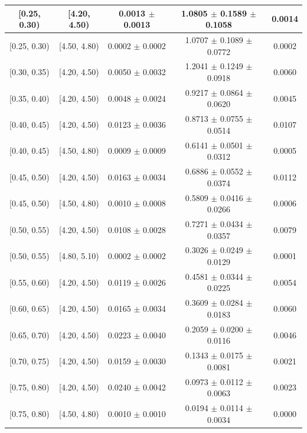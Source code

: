 \begin{longtable}{|c|c|c|c|c|}
\hline
\endlastfoot
[0.25, 0.30) & [4.20, 4.50) & 0.0013 $\pm$ 0.0013 & 1.0805 $\pm$ 0.1589 $\pm$ 0.1058 & 0.0014 \\ 
\hline
[0.25, 0.30) & [4.50, 4.80) & 0.0002 $\pm$ 0.0002 & 1.0707 $\pm$ 0.1089 $\pm$ 0.0772 & 0.0002 \\ 
\hline
[0.30, 0.35) & [4.20, 4.50) & 0.0050 $\pm$ 0.0032 & 1.2041 $\pm$ 0.1249 $\pm$ 0.0918 & 0.0060 \\ 
\hline
[0.35, 0.40) & [4.20, 4.50) & 0.0048 $\pm$ 0.0024 & 0.9217 $\pm$ 0.0864 $\pm$ 0.0620 & 0.0045 \\ 
\hline
[0.40, 0.45) & [4.20, 4.50) & 0.0123 $\pm$ 0.0036 & 0.8713 $\pm$ 0.0755 $\pm$ 0.0514 & 0.0107 \\ 
\hline
[0.40, 0.45) & [4.50, 4.80) & 0.0009 $\pm$ 0.0009 & 0.6141 $\pm$ 0.0501 $\pm$ 0.0312 & 0.0005 \\ 
\hline
[0.45, 0.50) & [4.20, 4.50) & 0.0163 $\pm$ 0.0034 & 0.6886 $\pm$ 0.0552 $\pm$ 0.0374 & 0.0112 \\ 
\hline
[0.45, 0.50) & [4.50, 4.80) & 0.0010 $\pm$ 0.0008 & 0.5809 $\pm$ 0.0416 $\pm$ 0.0266 & 0.0006 \\ 
\hline
[0.50, 0.55) & [4.20, 4.50) & 0.0108 $\pm$ 0.0028 & 0.7271 $\pm$ 0.0434 $\pm$ 0.0357 & 0.0079 \\ 
\hline
[0.50, 0.55) & [4.80, 5.10) & 0.0002 $\pm$ 0.0002 & 0.3026 $\pm$ 0.0249 $\pm$ 0.0129 & 0.0001 \\ 
\hline
[0.55, 0.60) & [4.20, 4.50) & 0.0119 $\pm$ 0.0026 & 0.4581 $\pm$ 0.0344 $\pm$ 0.0225 & 0.0054 \\ 
\hline
[0.60, 0.65) & [4.20, 4.50) & 0.0165 $\pm$ 0.0034 & 0.3609 $\pm$ 0.0284 $\pm$ 0.0183 & 0.0060 \\ 
\hline
[0.65, 0.70) & [4.20, 4.50) & 0.0223 $\pm$ 0.0040 & 0.2059 $\pm$ 0.0200 $\pm$ 0.0116 & 0.0046 \\ 
\hline
[0.70, 0.75) & [4.20, 4.50) & 0.0159 $\pm$ 0.0030 & 0.1343 $\pm$ 0.0175 $\pm$ 0.0081 & 0.0021 \\ 
\hline
[0.75, 0.80) & [4.20, 4.50) & 0.0240 $\pm$ 0.0042 & 0.0973 $\pm$ 0.0112 $\pm$ 0.0063 & 0.0023 \\ 
\hline
[0.75, 0.80) & [4.50, 4.80) & 0.0010 $\pm$ 0.0010 & 0.0194 $\pm$ 0.0114 $\pm$ 0.0034 & 0.0000 \\ 
\hline
\end{longtable}
